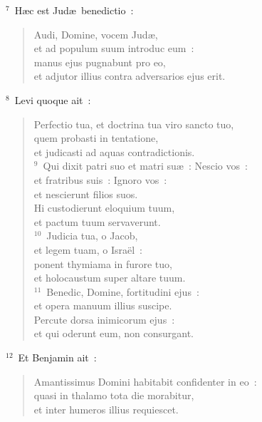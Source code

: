 ${}^{7}$~H\ae c est Jud\ae\ benedictio~: \begin{flushleft}\begin{verse}Audi, Domine, vocem Jud\ae ,\\ et ad populum suum introduc eum~:\\ manus ejus pugnabunt pro eo,\\ et adjutor illius contra adversarios ejus erit.\end{verse}\end{flushleft}


${}^{8}$~Levi quoque ait~: \begin{flushleft}\begin{verse}Perfectio tua, et doctrina tua viro sancto tuo,\\ quem probasti in tentatione,\\ et judicasti ad aquas contradictionis.\\
${}^{9}$~Qui dixit patri suo et matri su\ae~: Nescio vos~:\\ et fratribus suis~: Ignoro vos~:\\ et nescierunt filios suos.\\ Hi custodierunt eloquium tuum,\\ et pactum tuum servaverunt.\\
${}^{10}$~Judicia tua, o Jacob,\\ et legem tuam, o Isra\"el~:\\ ponent thymiama in furore tuo,\\ et holocaustum super altare tuum.\\
${}^{11}$~Benedic, Domine, fortitudini ejus~:\\ et opera manuum illius suscipe.\\ Percute dorsa inimicorum ejus~:\\ et qui oderunt eum, non consurgant.\end{verse}\end{flushleft}


${}^{12}$~Et Benjamin ait~: \begin{flushleft}\begin{verse}Amantissimus Domini habitabit confidenter in eo~:\\ quasi in thalamo tota die morabitur,\\ et inter humeros illius requiescet.\end{verse}\end{flushleft}


